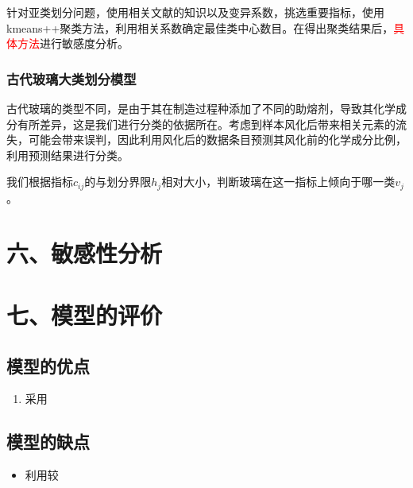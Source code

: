 \documentclass{my_paper}
\begin{document}
针对亚类划分问题，使用相关文献的知识以及变异系数，挑选重要指标，使用kmeans++聚类方法，利用相关系数确定最佳类中心数目。在得出聚类结果后，\textcolor{red}{具体方法}进行敏感度分析。

\subsubsection{古代玻璃大类划分模型}
古代玻璃的类型不同，是由于其在制造过程种添加了不同的助熔剂，导致其化学成分有所差异，这是我们进行分类的依据所在。考虑到样本风化后带来相关元素的流失，可能会带来误判，因此利用风化后的数据条目预测其风化前的化学成分比例，利用预测结果进行分类。

我们根据指标$c_{ij}$的与划分界限$h_j$相对大小，判断玻璃在这一指标上倾向于哪一类$v_j$。
\section{六、敏感性分析}
\section{七、模型的评价}

\subsection{模型的优点}
\begin{enumerate}
    \item 采用

\end{enumerate}

\subsection{模型的缺点}
\begin{itemize}
    \item 利用较

\end{itemize}

\newpage
\begin{center}
\end{center}

\newpage
\end{document}
